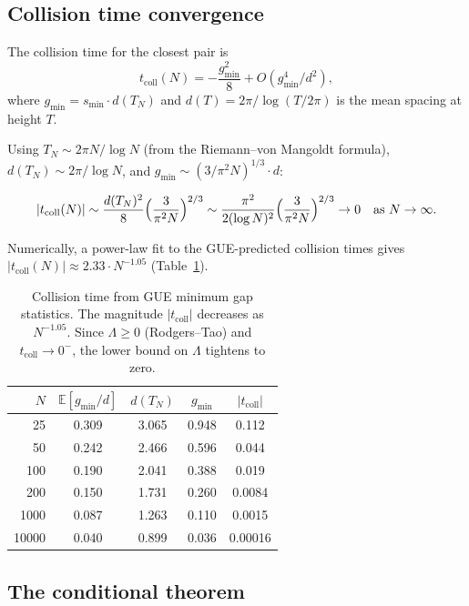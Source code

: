 \documentclass[11pt,a4paper]{article}
\begin{document}
\subsection{Collision time convergence}

The collision time for the closest pair is
\[
  t_{\mathrm{coll}}(N) = -\frac{g_{\min}^2}{8} + O(g_{\min}^4/d^2),
\]
where $g_{\min} = s_{\min} \cdot d(T_N)$ and $d(T) = 2\pi/\log(T/2\pi)$ is the mean spacing at height $T$.

Using $T_N \sim 2\pi N/\log N$ (from the Riemann--von Mangoldt
formula), $d(T_N) \sim 2\pi/\log N$, and
$g_{\min} \sim (3/\pi^2 N)^{1/3} \cdot d$:

\begin{equation}\label{eq:tcoll-scaling}
  |t_{\mathrm{coll}}(N)| \sim \frac{d(T_N)^2}{8}
    \Bigl(\frac{3}{\pi^2 N}\Bigr)^{2/3}
  \sim \frac{\pi^2}{2(\log N)^2}
    \Bigl(\frac{3}{\pi^2 N}\Bigr)^{2/3}
  \to 0 \quad \text{as } N \to \infty.
\end{equation}

Numerically, a power-law fit to the GUE-predicted collision times
gives $|t_{\mathrm{coll}}(N)| \approx 2.33 \cdot N^{-1.05}$
(Table~\ref{tab:lambda}).

\begin{table}[t]
\centering
\begin{tabular}{@{}rcccc@{}}
\toprule
$N$ & $\mathbb{E}[g_{\min}/d]$ & $d(T_N)$ & $g_{\min}$ & $|t_{\mathrm{coll}}|$ \\
\midrule
25  & 0.309 & 3.065 & 0.948 & 0.112 \\
50  & 0.242 & 2.466 & 0.596 & 0.044 \\
100 & 0.190 & 2.041 & 0.388 & 0.019 \\
200 & 0.150 & 1.731 & 0.260 & 0.0084 \\
1000 & 0.087 & 1.263 & 0.110 & 0.0015 \\
10000 & 0.040 & 0.899 & 0.036 & 0.00016 \\
\bottomrule
\end{tabular}
\caption{Collision time from GUE minimum gap statistics. The magnitude
  $|t_{\mathrm{coll}}|$ decreases as $N^{-1.05}$. Since $\Lambda \geq 0$
  (Rodgers--Tao) and $t_{\mathrm{coll}} \to 0^-$, the lower bound on
  $\Lambda$ tightens to zero.}
\label{tab:lambda}
\end{table}

\subsection{The conditional theorem}
\end{document}

